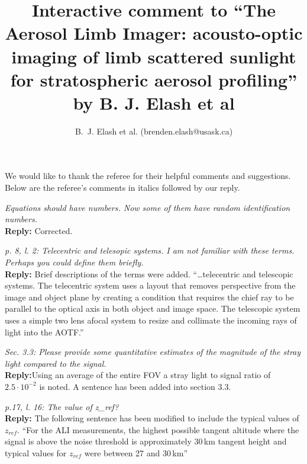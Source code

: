 \documentclass[12pt, notitlepage]{article}
\title{Interactive comment to ``The Aerosol Limb Imager: acousto-optic imaging of limb scattered
sunlight for stratospheric aerosol profiling'' by B. J. Elash et al}
\author{B.~J. Elash et al. (brenden.elash@usask.ca)}
\begin{document}
\begin{titlepage}
\maketitle
\end{titlepage}


We would like to thank the referee for their helpful comments and suggestions. Below are the referee's comments in italics followed by our reply.

\hrulefill

\textit{Equations should have numbers. Now some of them have random identification numbers.}\\

\textbf{Reply:} Corrected.

\hrulefill

\textit{p. 8, l. 2: Telecentric and telesopic systems. I am not familiar with these terms. Perhaps you could define them briefly.}\\

\textbf{Reply:} Brief descriptions of the terms were added. ``\ldots telecentric and telescopic systems. The telecentric system uses a layout that removes perspective from the image and object plane by creating a condition that requires the chief ray to be parallel to the optical axis in both object and image space. The telescopic system uses a simple two lens afocal system to resize and collimate the incoming rays of light into the AOTF.''

\hrulefill

\textit{Sec. 3.3: Please provide some quantitative estimates of the magnitude of the stray light compared to the signal.}\\

\textbf{Reply:}Using an average of the entire FOV a stray light to signal ratio of $2.5\cdot10^{-2}$ is noted. A sentence has been added into section 3.3.

\hrulefill

\textit{p.17, l. 16: The value of z\_ref?}\\

\textbf{Reply:} The following sentence has been modified to include the typical values of $z_{ref}$. ``For the ALI measurements, the highest
possible tangent altitude where the signal is above the noise threshold is
approximately 30\,km tangent height and typical values for $z_{ref}$ were between 27 and 30\,km''

\hrulefill
\end{document}
